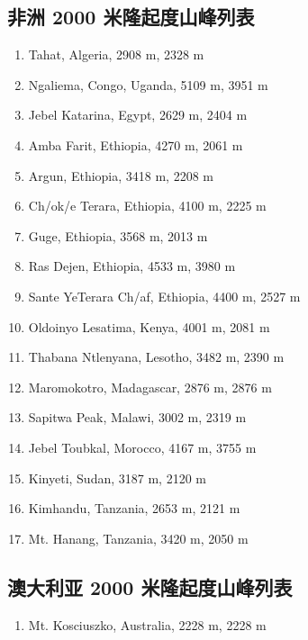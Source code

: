 \documentclass[10pt,twocolumn,letterpaper]{article}
\begin{document}
\subsection{非洲 2000 米隆起度山峰列表}

\begin{flushleft}
\begin{enumerate}
    \item Tahat, Algeria, 2908 m, 2328 m
    \item Ngaliema, Congo, Uganda, 5109 m, 3951 m
    \item Jebel Katarina, Egypt, 2629 m, 2404 m
    \item Amba Farit, Ethiopia, 4270 m, 2061 m
    \item Argun, Ethiopia, 3418 m, 2208 m
    \item Ch/ok/e Terara, Ethiopia, 4100 m, 2225 m
    \item Guge, Ethiopia, 3568 m, 2013 m
    \item Ras Dejen, Ethiopia, 4533 m, 3980 m
    \item Sante YeTerara Ch/af, Ethiopia, 4400 m, 2527 m
    \item Oldoinyo Lesatima, Kenya, 4001 m, 2081 m
    \item Thabana Ntlenyana, Lesotho, 3482 m, 2390 m
    \item Maromokotro, Madagascar, 2876 m, 2876 m
    \item Sapitwa Peak, Malawi, 3002 m, 2319 m
    \item Jebel Toubkal, Morocco, 4167 m, 3755 m
    \item Kinyeti, Sudan, 3187 m, 2120 m
    \item Kimhandu, Tanzania, 2653 m, 2121 m
    \item Mt. Hanang, Tanzania, 3420 m, 2050 m
\end{enumerate}
\end{flushleft}

\subsection{澳大利亚 2000 米隆起度山峰列表}

\begin{flushleft}
\begin{enumerate}
    \item Mt. Kosciuszko, Australia, 2228 m, 2228 m
\end{enumerate}
\end{flushleft}
\end{document}
